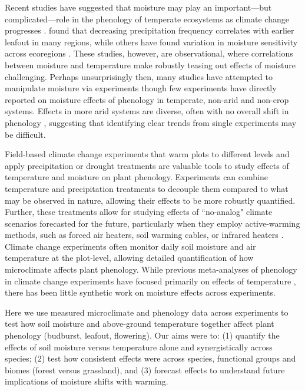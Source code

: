 \documentclass{article}
\begin{document}
\par Recent studies have suggested that moisture may play an important---but complicated---role in the phenology of temperate ecosystems as climate change progresses \citep[e.g.,][]{seyed2018,wang2022}. \citet{wang2022} found that decreasing precipitation frequency correlates with earlier leafout in many regions, while others have found variation in moisture sensitivity across ecoregions \citep{seyed2018}. These studies, however, are observational, where correlations between moisture and temperature make robustly teasing out effects of moisture challenging. Perhaps unsurprisingly then, many studies have attempted to manipulate moisture via experiments \citep[e.g.,][]{morin2010,hoeppner2012,rollinson2012b,clark2014a} though few experiments have directly reported on moisture effects of phenology in temperate, non-arid and non-crop systems. Effects in more arid systems are diverse, often with no overall shift in phenology \citep[e.g.,][]{sherry2007,de2017challenging,howell2020}, suggesting that identifying clear trends from single experiments may be difficult. 
\par Field-based climate change experiments that warm plots to different levels and apply precipitation or drought treatments are valuable tools to study effects of temperature and moisture on plant phenology. Experiments can combine temperature and precipitation treatments to decouple them compared to what may be observed in nature, allowing their effects to be more robustly quantified. Further, these treatments allow for studying effects of ``no-analog" climate scenarios forecasted for the future, particularly when they employ active-warming methods, such as forced air heaters, soil warming cables, or infrared heaters \citep{shaver2000,williams2007b,aronson2009}. Climate change experiments often monitor daily soil moisture and air temperature at the plot-level, allowing detailed quantification of how microclimate affects plant phenology. While previous meta-analyses of phenology in climate change experiments have focused primarily on effects of temperature \citep[e.g.,][]{wolkovich2012a}, there has been little synthetic work on moisture effects across experiments. 
\par Here we use measured microclimate and phenology data across experiments to test how soil moisture and above-ground temperature together affect plant phenology (budburst, leafout, flowering). Our aims were to: (1) quantify the effects of soil moisture versus temperature alone and synergistically across species; (2) test how consistent effects were across species, functional groups and biomes (forest versus grassland), and (3) forecast effects to understand future implications of moisture shifts with warming. 
\end{document}
